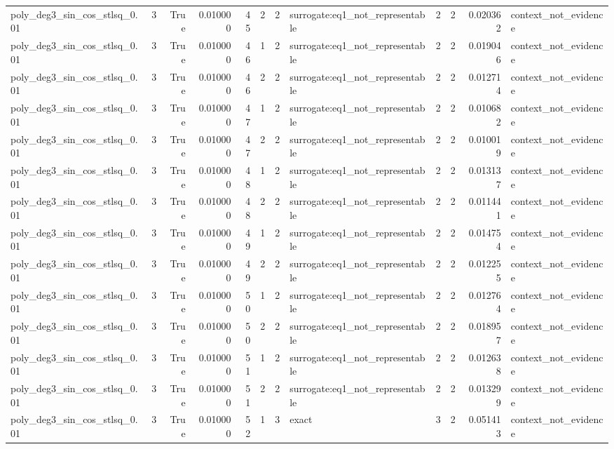 \begin{tabular}{lrrrrrrlrrrl}
poly\_deg3\_sin\_cos\_stlsq\_0.01 & 3 & True & 0.010000 & 45 & 2 & 2 & surrogate:eq1\_not\_representable & 2 & 2 & 0.020362 & context\_not\_evidence \\
poly\_deg3\_sin\_cos\_stlsq\_0.01 & 3 & True & 0.010000 & 46 & 1 & 2 & surrogate:eq1\_not\_representable & 2 & 2 & 0.019046 & context\_not\_evidence \\
poly\_deg3\_sin\_cos\_stlsq\_0.01 & 3 & True & 0.010000 & 46 & 2 & 2 & surrogate:eq1\_not\_representable & 2 & 2 & 0.012714 & context\_not\_evidence \\
poly\_deg3\_sin\_cos\_stlsq\_0.01 & 3 & True & 0.010000 & 47 & 1 & 2 & surrogate:eq1\_not\_representable & 2 & 2 & 0.010682 & context\_not\_evidence \\
poly\_deg3\_sin\_cos\_stlsq\_0.01 & 3 & True & 0.010000 & 47 & 2 & 2 & surrogate:eq1\_not\_representable & 2 & 2 & 0.010019 & context\_not\_evidence \\
poly\_deg3\_sin\_cos\_stlsq\_0.01 & 3 & True & 0.010000 & 48 & 1 & 2 & surrogate:eq1\_not\_representable & 2 & 2 & 0.013137 & context\_not\_evidence \\
poly\_deg3\_sin\_cos\_stlsq\_0.01 & 3 & True & 0.010000 & 48 & 2 & 2 & surrogate:eq1\_not\_representable & 2 & 2 & 0.011441 & context\_not\_evidence \\
poly\_deg3\_sin\_cos\_stlsq\_0.01 & 3 & True & 0.010000 & 49 & 1 & 2 & surrogate:eq1\_not\_representable & 2 & 2 & 0.014754 & context\_not\_evidence \\
poly\_deg3\_sin\_cos\_stlsq\_0.01 & 3 & True & 0.010000 & 49 & 2 & 2 & surrogate:eq1\_not\_representable & 2 & 2 & 0.012255 & context\_not\_evidence \\
poly\_deg3\_sin\_cos\_stlsq\_0.01 & 3 & True & 0.010000 & 50 & 1 & 2 & surrogate:eq1\_not\_representable & 2 & 2 & 0.012764 & context\_not\_evidence \\
poly\_deg3\_sin\_cos\_stlsq\_0.01 & 3 & True & 0.010000 & 50 & 2 & 2 & surrogate:eq1\_not\_representable & 2 & 2 & 0.018957 & context\_not\_evidence \\
poly\_deg3\_sin\_cos\_stlsq\_0.01 & 3 & True & 0.010000 & 51 & 1 & 2 & surrogate:eq1\_not\_representable & 2 & 2 & 0.012638 & context\_not\_evidence \\
poly\_deg3\_sin\_cos\_stlsq\_0.01 & 3 & True & 0.010000 & 51 & 2 & 2 & surrogate:eq1\_not\_representable & 2 & 2 & 0.013299 & context\_not\_evidence \\
poly\_deg3\_sin\_cos\_stlsq\_0.01 & 3 & True & 0.010000 & 52 & 1 & 3 & exact & 3 & 2 & 0.051413 & context\_not\_evidence \\

\end{tabular}
